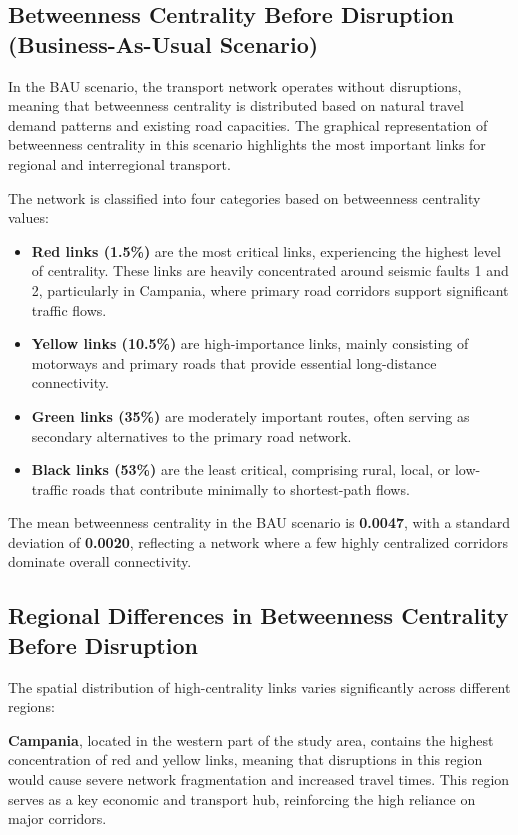 \subsection{Betweenness Centrality Before Disruption (Business-As-Usual Scenario)}

In the BAU scenario, the transport network operates without disruptions, meaning that betweenness centrality is distributed based on natural travel demand patterns and existing road capacities. The graphical representation of betweenness centrality in this scenario highlights the most important links for regional and interregional transport.

The network is classified into four categories based on betweenness centrality values:

\begin{itemize}
    \item \textbf{Red links (1.5\%)} are the most critical links, experiencing the highest level of centrality. These links are heavily concentrated around seismic faults 1 and 2, particularly in Campania, where primary road corridors support significant traffic flows.
    \item \textbf{Yellow links (10.5\%)} are high-importance links, mainly consisting of motorways and primary roads that provide essential long-distance connectivity.
    \item \textbf{Green links (35\%)} are moderately important routes, often serving as secondary alternatives to the primary road network.
    \item \textbf{Black links (53\%)} are the least critical, comprising rural, local, or low-traffic roads that contribute minimally to shortest-path flows.
\end{itemize}

The mean betweenness centrality in the BAU scenario is \textbf{0.0047}, with a standard deviation of \textbf{0.0020}, reflecting a network where a few highly centralized corridors dominate overall connectivity.

\subsection{Regional Differences in Betweenness Centrality Before Disruption}

The spatial distribution of high-centrality links varies significantly across different regions:

\textbf{Campania}, located in the western part of the study area, contains the highest concentration of red and yellow links, meaning that disruptions in this region would cause severe network fragmentation and increased travel times. This region serves as a key economic and transport hub, reinforcing the high reliance on major corridors.

